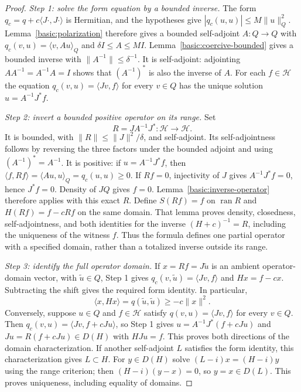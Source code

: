 \documentclass[11pt,a4paper]{article}
\theoremstyle{definition}
\theoremstyle{remark}
\begin{document}
\begin{proof}
\emph{Step 1: solve the form equation by a bounded inverse.}
The form $q_c=q+c\langle J\cdot,J\cdot\rangle$ is Hermitian, and
the hypotheses give $|q_c(u,u)|\leq M\|u\|_Q^2$.
Lemma~\ref{basic:polarization} therefore gives a bounded self-adjoint
$A:Q\to Q$ with $q_c(v,u)=\langle v,Au\rangle_Q$ and
$\delta I\leq A\leq MI$. Lemma~\ref{basic:coercive-bounded}
gives a bounded inverse with $\|A^{-1}\|\leq\delta^{-1}$.
It is self-adjoint: adjointing $AA^{-1}=A^{-1}A=I$ shows
that $(A^{-1})^*$ is also the inverse of $A$.
For each $f\in\mathcal H$ the equation
$q_c(v,u)=\langle Jv,f\rangle$ for every $v\in Q$ has the
unique solution $u=A^{-1}J^*f$.

\emph{Step 2: invert a bounded positive operator on its range.} Set
\[
 R=JA^{-1}J^*: \mathcal H\longrightarrow\mathcal H.
\]
It is bounded, with $\|R\|\leq\|J\|^2/\delta$, and self-adjoint.
Its self-adjointness follows by reversing the three factors under
the bounded adjoint and using $(A^{-1})^*=A^{-1}$. It is positive: if
$u=A^{-1}J^*f$, then
$\langle f,Rf\rangle=\langle Au,u\rangle_Q=q_c(u,u)\geq0$.
If $Rf=0$, injectivity of $J$ gives $A^{-1}J^*f=0$,
hence $J^*f=0$. Density of $JQ$ gives $f=0$. Lemma~\ref{basic:inverse-operator} therefore applies with this exact
$R$. Define $S(Rf)=f$ on $\operatorname{ran}R$ and
$H(Rf)=f-cRf$ on the same domain. That lemma proves density,
closedness, self-adjointness, and both identities for the inverse
$(H+c)^{-1}=R$, including the uniqueness of the witness $f$.
Thus the formula defines one partial operator with a specified
domain, rather than a totalized inverse outside its range.

\emph{Step 3: identify the full operator domain.}
If $x=Rf=J\widetilde u$ is an ambient operator-domain vector,
with $\widetilde u\in Q$, Step 1 gives
$q_c(v,\widetilde u)=\langle Jv,f\rangle$ and $Hx=f-cx$.
Subtracting the shift gives the required form identity. In particular,
\[
 \langle x,Hx\rangle=q(\widetilde u,\widetilde u)
 \geq-c\|x\|^2.
\]
Conversely, suppose $u\in Q$ and $f\in\mathcal H$ satisfy
$q(v,u)=\langle Jv,f\rangle$ for every $v\in Q$.
Then $q_c(v,u)=\langle Jv,f+cJu\rangle$, so Step 1 gives
$u=A^{-1}J^*(f+cJu)$ and $Ju=R(f+cJu)\in D(H)$ with $HJu=f$.
This proves both directions of the domain characterization.
If another self-adjoint $L$ satisfies the form identity, this
characterization gives $L\subset H$. For $y\in D(H)$ solve
$(L-i)x=(H-i)y$ using the range criterion; then
$(H-i)(y-x)=0$, so $y=x\in D(L)$. This proves uniqueness,
including equality of domains.


\end{proof}
\end{document}
